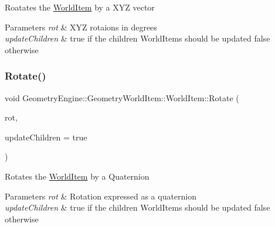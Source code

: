 Roatates the \mbox{\hyperlink{class_geometry_engine_1_1_geometry_world_item_1_1_world_item}{World\+Item}} by a X\+YZ vector 
\begin{DoxyParams}{Parameters}
{\em rot} & X\+YZ rotaions in degrees \\
\hline
{\em update\+Children} & true if the children World\+Items should be updated false otherwise \\
\hline
\end{DoxyParams}
\mbox{\label{class_geometry_engine_1_1_geometry_world_item_1_1_world_item_aabed6bd78138071c0c7fb50a415ff285}} 
\subsubsection{\texorpdfstring{Rotate()}{Rotate()}\hspace{0.1cm}{\footnotesize\ttfamily [2/2]}}
{\footnotesize\ttfamily void Geometry\+Engine\+::\+Geometry\+World\+Item\+::\+World\+Item\+::\+Rotate (\begin{DoxyParamCaption}\item[{const Q\+Quaternion \&}]{rot,  }\item[{bool}]{update\+Children = {\ttfamily true} }\end{DoxyParamCaption})}

Rotates the \mbox{\hyperlink{class_geometry_engine_1_1_geometry_world_item_1_1_world_item}{World\+Item}} by a Quaternion 
\begin{DoxyParams}{Parameters}
{\em rot} & Rotation expressed as a quaternion \\
\hline
{\em update\+Children} & true if the children World\+Items should be updated false otherwise \\
\hline
\end{DoxyParams}
\mbox{\label{class_geometry_engine_1_1_geometry_world_item_1_1_world_item_ad6ca95d9209a5ab13975a3a7347b497d}} 
